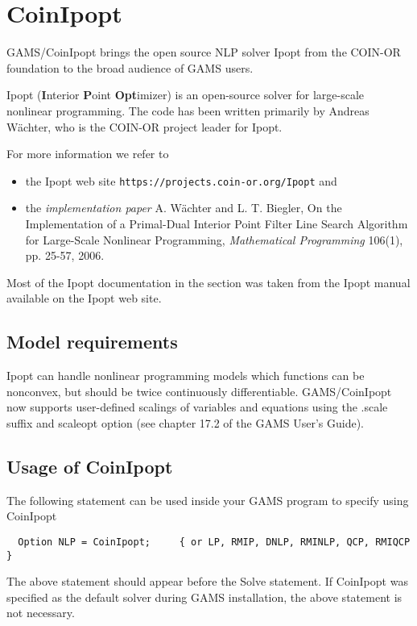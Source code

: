 




\section{CoinIpopt}

GAMS/CoinIpopt brings the open source NLP solver Ipopt from the COIN-OR foundation to the broad audience of GAMS users.

Ipopt (\textbf{I}nterior \textbf{P}oint \textbf{Opt}imizer) is an open-source solver for large-scale nonlinear programming.
The code has been written primarily by Andreas W\"achter, who is the COIN-OR project leader for Ipopt.

For more information we refer to
\begin{itemize}
\item the Ipopt web site \texttt{https://projects.coin-or.org/Ipopt} and
\item the \emph{implementation paper} A. W\"achter and L. T. Biegler, On the Implementation of a Primal-Dual Interior Point Filter Line Search Algorithm for Large-Scale Nonlinear Programming, \emph{Mathematical Programming} 106(1), pp. 25-57, 2006.
\end{itemize}
Most of the Ipopt documentation in the section was taken from the Ipopt manual available on the Ipopt web site.

\subsection{Model requirements}

Ipopt can handle nonlinear programming models which functions can be nonconvex, but should be twice continuously differentiable.
GAMS/CoinIpopt now supports user-defined scalings of variables and equations using the .scale suffix and scaleopt option (see chapter 17.2 of the GAMS User's Guide).

\subsection{Usage of CoinIpopt}

The following statement can be used inside your GAMS program to specify using CoinIpopt
\begin{verbatim}
  Option NLP = CoinIpopt;     { or LP, RMIP, DNLP, RMINLP, QCP, RMIQCP }
\end{verbatim}

The above statement should appear before the Solve statement.
If CoinIpopt was specified as the default solver during GAMS installation, the above statement is not necessary.

